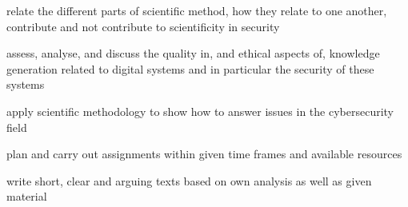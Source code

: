 \usepackage{xparse}
\NewDocumentCommand{\newLO}{m m m}{%
  \expandafter\DeclareDocumentCommand{#1}{s}{%
    \IfBooleanT{##1}{\label{#2}}%
    #3%
}}

{relate the different parts of scientific method, how they relate to one 
another, contribute and not contribute to scientificity in security}

{assess, analyse, and discuss the quality in, and ethical aspects of, knowledge 
generation related to digital systems and in particular the security of these 
systems}

{apply scientific methodology to show how to answer issues in the cybersecurity 
field}

{plan and carry out assignments within given time frames and available 
resources}

{write short, clear and arguing texts based on own analysis as well as given 
material}
